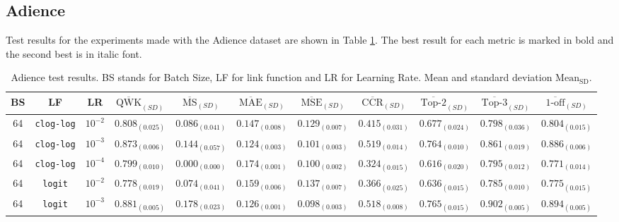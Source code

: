 \documentclass[journal]{IEEEtran}
\begin{document}
	\subsection{Adience}
	\label{sect:adience}
	Test results for the experiments made with the Adience dataset are shown in Table \ref{table:AdienceTest}. The best result for each metric is marked in bold and the second best is in italic font.
	
	\begin{table}[!t]
		\caption{Adience test results. BS stands for Batch Size, LF for link function and LR for Learning Rate. Mean and standard deviation $\text{Mean}_\text{SD}$.}
		\label{table:AdienceTest}
		\footnotesize
		\centering
		\begin{tabular}{c@{\hskip 0.15cm}c@{\hskip 0.15cm}c@{\hskip 0.15cm}c@{\hskip 0.30cm}c@{\hskip 0.20cm}c@{\hskip 0.20cm}c@{\hskip 0.20cm}c@{\hskip 0.20cm}c@{\hskip 0.20cm}c@{\hskip 0.20cm}c}
			\hline
			\hline
			BS & LF & LR & $\overline{\text{QWK}}_{{(SD)}}$ & $\overline{\text{MS}}_{{(SD)}}$ & $\overline{\text{MAE}}_{{(SD)}}$ & $\overline{\text{MSE}}_{{(SD)}}$ & $\overline{\text{CCR}}_{{(SD)}}$ & $\overline{\text{Top-2}}_{{(SD)}}$ & $\overline{\text{Top-3}}_{{(SD)}}$ & $\overline{\text{1-off}}_{{(SD)}}$\\\hline
			64 & \texttt{clog-log} & $10^{-2}$ & $0.808_{(0.025)}$ & $0.086_{(0.041)}$ & $0.147_{(0.008)}$ & $0.129_{(0.007)}$ & $0.415_{(0.031)}$ & $0.677_{(0.024)}$ & $0.798_{(0.036)}$ & $0.804_{(0.015)}$\\
			64 & \texttt{clog-log} & $10^{-3}$ & $0.873_{(0.006)}$ & $0.144_{(0.057)}$ & $\mathbf{0.124_{(0.003)}}$ & $0.101_{(0.003)}$ & $\mathbf{0.519_{(0.014)}}$ & $\mathit{0.764_{(0.010)}}$ & $0.861_{(0.019)}$ & $0.886_{(0.006)}$\\
			64 & \texttt{clog-log} & $10^{-4}$ & $0.799_{(0.010)}$ & $0.000_{(0.000)}$ & $0.174_{(0.001)}$ & $0.100_{(0.002)}$ & $0.324_{(0.015)}$ & $0.616_{(0.020)}$ & $0.795_{(0.012)}$ & $0.771_{(0.014)}$\\
			64 & \texttt{logit} & $10^{-2}$ & $0.778_{(0.019)}$ & $0.074_{(0.041)}$ & $0.159_{(0.006)}$ & $0.137_{(0.007)}$ & $0.366_{(0.025)}$ & $0.636_{(0.015)}$ & $0.785_{(0.010)}$ & $0.775_{(0.015)}$\\
			64 & \texttt{logit} & $10^{-3}$ & $\mathbf{0.881_{(0.005)}}$ & $\mathit{0.178_{(0.023)}}$ & $\mathit{0.126_{(0.001)}}$ & $0.098_{(0.003)}$ & $\mathit{0.518_{(0.008)}}$ & $\mathbf{0.765_{(0.015)}}$ & $\mathbf{0.902_{(0.005)}}$ & $\mathbf{0.894_{(0.005)}}$\\

\end{tabular}
\end{table}
\end{document}

